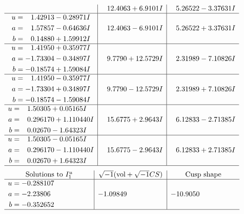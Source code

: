 \documentclass[1p]{elsarticle_modified}
\theoremstyle{definition}
\newcommand{\I}{\sqrt{-1}}
\begin{document}
$$\begin{array}{c|c|c}
 & \phantom{-}12.4063 + 6.9101 I & \phantom{-}5.26522 - 3.37631 I \\ \hline\begin{aligned}
u &= \phantom{-}1.42913 - 0.28971 I \\
a &= \phantom{-}1.57857 - 0.64636 I \\
b &= \phantom{-}0.14880 + 1.59912 I\end{aligned}
 & \phantom{-}12.4063 - 6.9101 I & \phantom{-}5.26522 + 3.37631 I \\ \hline\begin{aligned}
u &= \phantom{-}1.41950 + 0.35977 I \\
a &= -1.73304 - 0.34897 I \\
b &= -0.18574 + 1.59084 I\end{aligned}
 & \phantom{-}9.7790 + 12.5729 I & \phantom{-}2.31989 - 7.10826 I \\ \hline\begin{aligned}
u &= \phantom{-}1.41950 - 0.35977 I \\
a &= -1.73304 + 0.34897 I \\
b &= -0.18574 - 1.59084 I\end{aligned}
 & \phantom{-}9.7790 - 12.5729 I & \phantom{-}2.31989 + 7.10826 I \\ \hline\begin{aligned}
u &= \phantom{-}1.50305 + 0.05165 I \\
a &= \phantom{-}0.296170 + 1.110440 I \\
b &= \phantom{-}0.02670 - 1.64323 I\end{aligned}
 & \phantom{-}15.6775 + 2.9643 I & \phantom{-}6.12833 - 2.71385 I \\ \hline\begin{aligned}
u &= \phantom{-}1.50305 - 0.05165 I \\
a &= \phantom{-}0.296170 - 1.110440 I \\
b &= \phantom{-}0.02670 + 1.64323 I\end{aligned}
 & \phantom{-}15.6775 - 2.9643 I & \phantom{-}6.12833 + 2.71385 I\\
 \hline 
 \end{array}$$\newpage$$\begin{array}{c|c|c}  
\text{Solutions to }I^u_{1}& \I (\text{vol} + \sqrt{-1}CS) & \text{Cusp shape}\\
 \hline 
\begin{aligned}
u &= -0.288107\phantom{ +0.000000I} \\
a &= -2.23806\phantom{ +0.000000I} \\
b &= -0.352652\phantom{ +0.000000I}\end{aligned}
 & -1.09849\phantom{ +0.000000I} & -10.9050\phantom{ +0.000000I}\\
 \hline 
 \end{array}$$\newpage\newpage\renewcommand{\arraystretch}{1}
\end{document}
